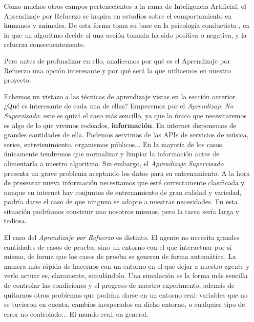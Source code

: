 Como muchos otros campos pertenecientes a la rama de Inteligencia Artificial, el Aprendizaje por Refuerzo \citep{Watkins1992} se inspira en estudios sobre el comportamiento en humanos y animales. De esta forma toma su base en la psicología conductista \citet{Skinner1953}, en la que un algoritmo decide si una acción tomada ha sido positiva o negativa, y la refuerza consecuentemente.

Pero antes de profundizar en ello, analicemos por qué es el Aprendizaje por Refuerzo una opción interesante y por qué será la que utilicemos en nuestro proyecto.

Echemos un vistazo a las técnicas de aprendizaje vistas en la sección anterior. ¿Qué es interesante de cada una de ellas? Empecemos por el \textit{Aprendizaje No Supervisado}: este es quizá el caso más sencillo, ya que lo único que necesitaremos es algo de lo que vivimos rodeados, \textbf{información}. En internet disponemos de grandes cantidades de ella. Podemos servirnos de las APIs de servicios de música, series, entretenimiento, organismos públicos... En la mayoría de los casos, únicamente tendremos que normalizar y limpiar la información antes de alimentarla a nuestro algoritmo. Sin embargo, el \textit{Aprendizaje Supervisado} presenta un grave problema aceptando los datos para su entrenamiento. A la hora de presentar nueva información necesitamos que esté correctamente clasificada y, aunque en internet hay conjuntos de entrenamiento de gran calidad y variedad, podría darse el caso de que ninguno se adapte a nuestras necesidades. En esta situación podríamos construir uno nosotros mismos, pero la tarea sería larga y tediosa.

El caso del \textit{Aprendizaje por Refuerzo} es distinto. El agente no necesita grandes cantidades de casos de prueba, sino un entorno con el que interactuar por sí mismo, de forma que los casos de prueba se generen de forma automática. La manera más rápida de hacernos con un entorno en el que dejar a nuestro agente y verlo actuar es, claramente, simulándolo. Una simulación es la forma más sencilla de controlar las condiciones y el progreso de nuestro experimento, además de quitarnos otros problemas que podrían darse en un entorno real: variables que no se tuvieron en cuenta, cambios inesperados en dicho entorno, o cualquier tipo de error no controlado... El mundo real, en general.


